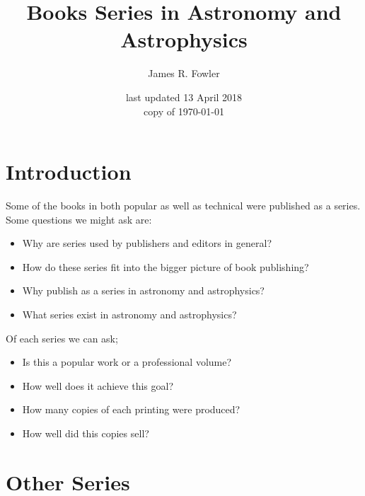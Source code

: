 \documentclass[letterpaper]{article}
\begin{document}
\title{Books Series in Astronomy and Astrophysics}
\author{James R. Fowler}
\date{last updated 13 April 2018\\ copy of \today}

  \maketitle

\tableofcontents
\listoftables


\section{Introduction}

Some of the books in  both popular as well as technical were published
as a series.  Some questions we might ask are:

\begin{itemize}
  \item Why are series used by publishers and editors in general?
  \item How do these series fit into the bigger picture of book publishing?
  \item Why publish as a series in astronomy and astrophysics?
  \item What series exist in astronomy and astrophysics?
\end{itemize}

Of each series we can ask;

\begin{itemize}
  \item Is this a popular work or a professional volume?
  \item How well does it achieve this goal?
  \item How many copies of each printing were produced?
  \item How well did this copies sell?
\end{itemize}






\section{Other Series}
\end{document}
